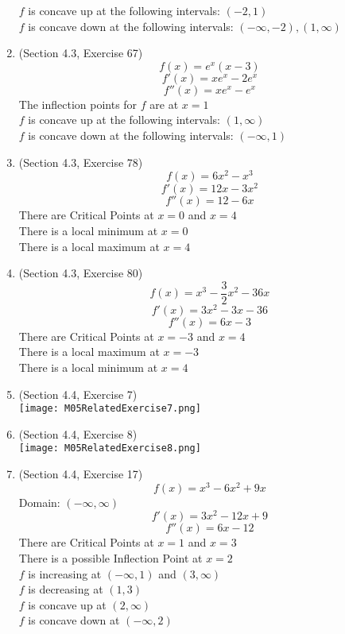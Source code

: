 \documentclass{article}
\begin{document}
\begin{enumerate}
        $f$ is concave up at the following intervals: $(-2, 1)$ \\
        $f$ is concave down at the following intervals: $(-\infty, -2), (1, \infty)$
    \item (Section 4.3, Exercise 67)
        $$f(x) = e^x\left(x - 3\right)$$
        $$f'(x) = xe^x - 2e^x$$
        $$f''(x) = xe^x - e^x$$
        The inflection points for $f$ are at $x = 1$ \\
        $f$ is concave up at the following intervals: $(1, \infty)$ \\
        $f$ is concave down at the following intervals: $(-\infty, 1)$
    \item (Section 4.3, Exercise 78)
        $$f(x) = 6x^2 - x^3$$
        $$f'(x) = 12x - 3x^2$$
        $$f''(x) = 12 - 6x$$
        There are Critical Points at $x = 0$ and $x = 4$ \\
        There is a local minimum at $x = 0$ \\
        There is a local maximum at $x = 4$
    \item (Section 4.3, Exercise 80)
        $$f(x) = x^3 - \frac{3}{2}x^2 - 36x$$
        $$f'(x) = 3x^2 - 3x - 36$$
        $$f''(x) = 6x - 3$$
        There are Critical Points at $x = -3$ and $x = 4$ \\
        There is a local maximum at $x = -3$ \\
        There is a local minimum at $x = 4$
    \item (Section 4.4, Exercise 7) \\
        \texttt{[image: M05RelatedExercise7.png]}
    \item (Section 4.4, Exercise 8) \\
        \texttt{[image: M05RelatedExercise8.png]}
    \item (Section 4.4, Exercise 17)
        $$f(x) = x^3 - 6x^2 + 9x$$
        Domain: $(-\infty, \infty)$
        $$f'(x) = 3x^2 - 12x + 9$$
        $$f''(x) = 6x - 12$$
        There are Critical Points at $x = 1$ and $x = 3$ \\
        There is a possible Inflection Point at $x = 2$ \\
        $f$ is increasing at $(-\infty, 1)$ and $(3, \infty)$ \\
        $f$ is decreasing at $(1, 3)$ \\
        $f$ is concave up at $(2, \infty)$ \\
        $f$ is concave down at $(-\infty, 2)$ \\

\end{enumerate}
\end{document}
